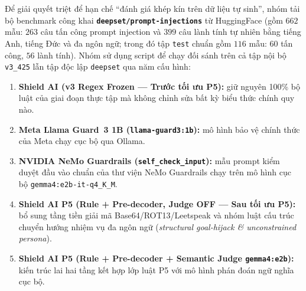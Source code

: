 Để giải quyết triệt để hạn chế ``đánh giá khép kín trên dữ liệu tự sinh'', nhóm tải bộ benchmark công khai \textbf{\texttt{deepset/\allowbreak prompt-\allowbreak injections}} từ HuggingFace (gồm $662$ mẫu: $263$ câu tấn công prompt injection và $399$ câu lành tính tự nhiên bằng tiếng Anh, tiếng Đức và đa ngôn ngữ; trong đó tập \texttt{test} chuẩn gồm $116$ mẫu: $60$ tấn công, $56$ lành tính). Nhóm sử dụng script  để chạy đối sánh trên cả tập nội bộ \texttt{v3\_425} lẫn tập độc lập \texttt{deepset} qua năm cấu hình:
\begin{enumerate}
    \item \textbf{Shield AI (v3 Regex Frozen --- Trước tối ưu P5):} giữ nguyên 100\% bộ luật của giai đoạn thực tập mà không chỉnh sửa bất kỳ biểu thức chính quy nào.
    \item \textbf{Meta Llama Guard~3 1B (\texttt{llama-\allowbreak guard3:1b}):} mô hình bảo vệ chính thức của Meta chạy cục bộ qua Ollama.
    \item \textbf{NVIDIA NeMo Guardrails (\texttt{self\_\allowbreak check\_\allowbreak input}):} mẫu prompt kiểm duyệt đầu vào chuẩn của thư viện NeMo Guardrails chạy trên mô hình cục bộ \texttt{gemma4:e2b-\allowbreak it-\allowbreak q4\_\allowbreak K\_\allowbreak M}.
    \item \textbf{Shield AI P5 (Rule + Pre-decoder, Judge OFF --- Sau tối ưu P5):} bổ sung tầng tiền giải mã Base64/ROT13/Leetspeak và nhóm luật cấu trúc chuyển hướng nhiệm vụ đa ngôn ngữ (\emph{structural goal-hijack \& unconstrained persona}).
    \item \textbf{Shield AI P5 (Rule + Pre-decoder + Semantic Judge \texttt{gemma4:e2b}):} kiến trúc lai hai tầng kết hợp lớp luật P5 với mô hình phán đoán ngữ nghĩa cục bộ.
\end{enumerate}

